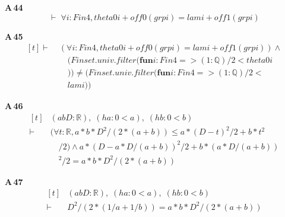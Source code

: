 \noindent\textbf{A\,44}\quad{}
{\footnotesize\[ \vdash\; \forall \mathit{i} : \mathit{Fin} 4, \mathit{theta0} \mathit{i} + \mathit{off0} (\mathit{grp} \mathit{i}) = \mathit{lam} \mathit{i} + \mathit{off1} (\mathit{grp} \mathit{i}) \]}

\noindent\textbf{A\,45}\quad{}
{\footnotesize\[ \begin{aligned}[t]
\vdash\;&(\forall \mathit{i} : \mathit{Fin} 4, \mathit{theta0} \mathit{i} + \mathit{off0} (\mathit{grp} \mathit{i}) = \mathit{lam} \mathit{i} + \mathit{off1} (\mathit{grp} \mathit{i})) \wedge\\
&\quad (\mathit{Finset}.\mathit{univ}.\mathit{filter} (\mathbf{fun} \mathit{i} : \mathit{Fin} 4 => (1:\mathbb{Q} )/2 < \mathit{theta0} \mathit{i}\\
&\quad )) \neq (\mathit{Finset}.\mathit{univ}.\mathit{filter} (\mathbf{fun} \mathit{i} : \mathit{Fin} 4 => (1:\mathbb{Q} )/2 <\\
&\quad \mathit{lam} \mathit{i}))
\end{aligned} \]}

\noindent\textbf{A\,46}\quad{}
{\footnotesize\[ \begin{aligned}[t]
&(\mathit{a} \mathit{b} \mathit{D} : \mathbb{R} ),\; (\mathit{ha} : 0 < \mathit{a}),\; (\mathit{hb} : 0 < \mathit{b})\\
\vdash\;&(\forall \mathit{t} : \mathbb{R} , \mathit{a} * \mathit{b} * \mathit{D} ^{2} / (2 * (\mathit{a} + \mathit{b})) \leq \mathit{a} * (\mathit{D} - \mathit{t}) ^{2} / 2 + \mathit{b} * \mathit{t} ^{2}\\
&\quad / 2) \wedge \mathit{a} * (\mathit{D} - \mathit{a} * \mathit{D} / (\mathit{a} + \mathit{b})) ^{2} / 2 + \mathit{b} * (\mathit{a} * \mathit{D} / (\mathit{a} + \mathit{b}))\\
&\quad ^{2} / 2 = \mathit{a} * \mathit{b} * \mathit{D} ^{2} / (2 * (\mathit{a} + \mathit{b}))
\end{aligned} \]}

\noindent\textbf{A\,47}\quad{}
{\footnotesize\[ \begin{aligned}[t]
&(\mathit{a} \mathit{b} \mathit{D} : \mathbb{R} ),\; (\mathit{ha} : 0 < \mathit{a}),\; (\mathit{hb} : 0 < \mathit{b})\\
\vdash\;&\mathit{D} ^{2} / (2 * (1 / \mathit{a} + 1 / \mathit{b})) = \mathit{a} * \mathit{b} * \mathit{D} ^{2} / (2 * (\mathit{a} + \mathit{b}))
\end{aligned} \]}

